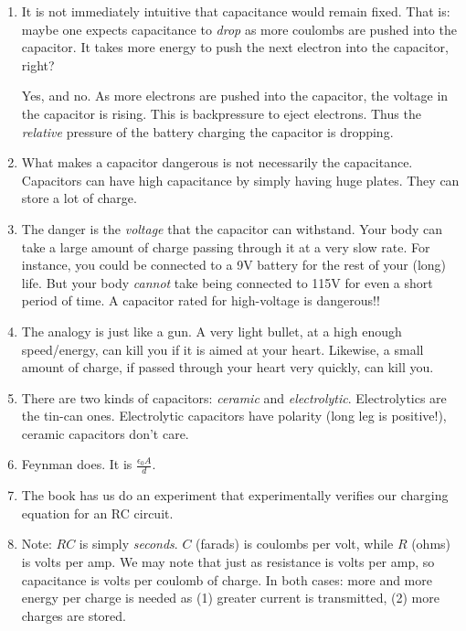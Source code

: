 \documentclass[11pt, oneside]{amsart}
\begin{document}
\begin{enumerate}
  \item It is not immediately intuitive that capacitance would remain
  fixed. That is: maybe one expects capacitance to \emph{drop} as more
  coulombs are pushed into the capacitor. It takes more energy to push
  the next electron into the capacitor, right?

  Yes, and no. As more electrons are pushed into the capacitor, the
  voltage in the capacitor is rising. This is backpressure to eject
  electrons. Thus the \emph{relative} pressure of the battery charging
  the capacitor is dropping.

  \item What makes a capacitor dangerous is not necessarily the
  capacitance. Capacitors can have high capacitance by simply having
  huge plates. They can store a lot of charge.

  \item The danger is the \emph{voltage} that the capacitor can
  withstand. Your body can take a large amount of charge passing through
  it at a very slow rate. For instance, you could be connected to a 9V
  battery for the rest of your (long) life. But your body \emph{cannot}
  take being connected to 115V for even a short period of time. A
  capacitor rated for high-voltage is dangerous!!

  \item The analogy is just like a gun. A very light bullet, at a high
  enough speed/energy, can kill you if it is aimed at your heart.
  Likewise, a small amount of charge, if passed through your heart very
  quickly, can kill you.

  \item There are two kinds of capacitors: \emph{ceramic} and
  \emph{electrolytic}. Electrolytics are the tin-can ones. Electrolytic
  capacitors have polarity (long leg is positive!), ceramic capacitors
  don't care. 

  \item {} Feynman does.
  It is $\frac{\epsilon_0 A}{d}$.

  \item The book has us do an experiment that experimentally verifies
  our charging equation for an RC circuit.

  \item Note: $RC$ is simply \emph{seconds}. $C$ (farads) is coulombs
  per volt, while $R$ (ohms) is volts per amp. We may note that just as
  resistance is volts per amp, so capacitance is volts per coulomb of
  charge. In both cases: more and more energy per charge is needed as
  (1) greater current is transmitted, (2) more charges are stored.

\end{enumerate}
\end{document}
